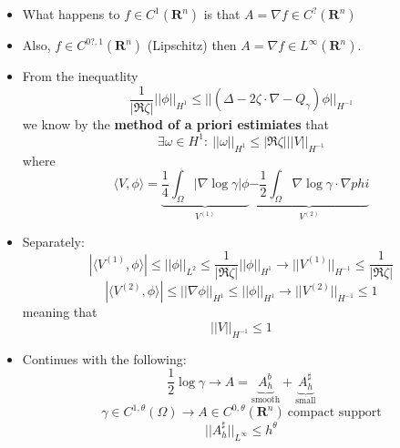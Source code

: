 \documentclass{article}
\begin{document}
\begin{itemize}
    \item What happens to $f \in C^1(\mathbf{R}^n)$ is that $A = \nabla f \in C^?(\mathbf{R}^n)$
    \item Also, $f \in C^{0?, 1}(\mathbf{R}^n)$ (Lipschitz) then $ A = \nabla f \in L^\infty(\mathbf{R}^n)$.

    \item From the inequatlity
    \begin{equation}
        \frac{1}{|\Re \zeta|} || \phi ||_{H^1} \leq || (\Delta - 2 \zeta \cdot \nabla - Q_\gamma) \phi ||_{H^{-1}}
    \end{equation}
    we know by the \textbf{method of a priori estimiates} that
    \begin{equation}
        \exists \omega \in H^1: \ ||\omega||_{H^1} \leq |\Re \zeta | || V ||_{H^{-1}}
    \end{equation}
    where
    \begin{equation}
        \langle V, \phi \rangle = \underbrace{\frac{1}{4} \int_\Omega |\nabla \log \gamma | \phi}_{V^{(1)}} \underbrace{- \frac{1}{2} \int_\Omega \nabla \log \gamma \cdot \nabla phi}_{V^{(2)}}
    \end{equation}

    \item Separately:
    \begin{equation}
        |\langle V^{(1)} ,\phi \rangle| \leq ||\phi||_{L^2} \leq \frac{1}{|\Re \zeta |} ||\phi||_{H^1} \rightarrow || V^{(1)} ||_{H^{-1}} \leq \frac{1}{|\Re \zeta |}
    \end{equation}
    \begin{equation}
        |\langle V^{(2)} ,\phi \rangle| \leq ||\nabla \phi||_{H^1} \leq ||\phi||_{H^1} \rightarrow || V^{(2)} ||_{H^{-1}} \leq 1
    \end{equation}
    meaning that 
    \begin{equation}
        ||V||_{H^{-1}} \leq 1
    \end{equation}

    \item Continues with the following:
    \begin{equation}
        \frac{1}{2} \log \gamma \rightarrow A = \underbrace{A_h^b}_{\text{smooth}} + \underbrace{A_h^\sharp}_{\text{small}}
    \end{equation}
    \begin{equation}
        \gamma \in C^{1,\theta}(\Omega) \rightarrow A \in C^{0, \theta} (\mathbf{R}^n) \ \text{compact support}
    \end{equation}
    \begin{equation}
        || A_h^\sharp ||_{L^\infty} \leq h^\theta
    \end{equation}


\end{itemize}
\end{document}

